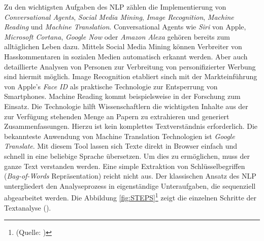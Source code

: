 Zu den wichtigsten Aufgaben des \ac{NLP} zählen die Implementierung von \textit{Conversational Agents}, \textit{Social Media Mining}, \textit{Image Recognition}, \textit{Machine Reading} und \textit{Machine Translation}. Conversational Agents wie \textit{Siri} von Apple, \textit{Microsoft Cortana}, \textit{Google Now} oder \textit{Amazon Alexa} gehören bereits zum alltäglichen Leben dazu. Mittels Social Media Mining können Verbreiter von Hasskommentaren in sozialen Medien automatisch erkannt werden. Aber auch detaillierte Analysen von Personen zur Verbreitung von personifizierter Werbung sind hiermit möglich. Image Recognition etabliert sinch mit der Markteinführung von Apple's \textit{Face ID} als praktische Technologie zur Entsperrung von Smartphones. Machine Reading kommt beispielsweise in der Forschung zum Einsatz. Die Technologie hilft Wissenschaftlern die wichtigsten Inhalte aus der zur Verfügung stehenden Menge an Papern zu extrahieren und generiert Zusammenfassungen. Hierzu ist kein komplettes Textverständnis erforderlich. Die bekannteste Anwendung  von Machine Translation Technologien ist \textit{Google Translate}. Mit diesem Tool lassen sich Texte direkt in Browser einfach und schnell in eine beliebige Sprache übersetzen. Um dies zu ermöglichen, muss der ganze Text verstanden werden. Eine simple Extraktion von Schlüsselbegriffen (\textit{Bag-of-Words} Repräsentation) reicht nicht aus.
Der klassischen Ansatz des \ac{NLP} untergliedert den Analyseprozess in eigenständige Unteraufgaben, die sequenziell abgearbeitet werden. Die Abbildung \ref{fig:STEPS}\footnote{(Quelle: \cite[vgl.][4]{DALE})} zeigt die einzelnen Schritte der Textanalyse (\cite[vgl.][4]{DALE}). 
